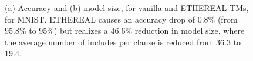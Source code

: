 \begin{figure}[htp!]
{\begin{tikzpicture}[font=\small, scale=1, every node/.style={scale=1}]
	\end{tikzpicture}

}
	\caption{(a) Accuracy and (b) model size, for vanilla and ETHEREAL TMs, for MNIST. ETHEREAL causes an accuracy drop of 0.8\% (from 95.8\% to 95\%) but realizes a 46.6\% reduction in model size, where the average number of includes per clause is reduced from 36.3 to 19.4.}
	\label{fig:exclude_training}

    
\end{figure}